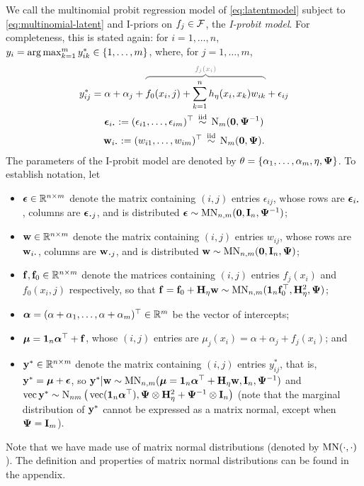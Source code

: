 We call the multinomial probit regression model of \cref{eq:latentmodel} subject to \cref{eq:multinomial-latent} and I-priors on $f_j \in {\mathcal F}$, the \emph{I-probit model}.
For completeness, this is stated again: for $i=1,\dots,n$, $y_i = \operatorname*{arg\,max}_{k=1}^m y_{ik}^* \in \{1,\dots,m\}$, where, for $j=1,\dots,m$,
\begin{align}\label{eq:iprobitmod}
  \begin{gathered}
    y_{ij}^* = \alpha + \alpha_j + 
    \greyoverbrace{f_0(x_i, j) + \sum_{k=1}^n h_\eta(x_i,x_k)w_{ik}}{f_j(x_i)}
    + \epsilon_{ij} \\
    \bepsilon_{i \bigcdot} := (\epsilon_{i1}, \dots, \epsilon_{im})^\top  \iid \N_m(\bzero, \bPsi^{-1}) \\
    \bw_{i \bigcdot} := (w_{i1},\dots,w_{im})^\top \iid \N_m(\bzero,\bPsi).
  \end{gathered}
\end{align}
The parameters of the I-probit model are denoted by $\theta = \{\alpha_1,\dots,\alpha_m,\eta,{\bm\Psi} \}$.
To establish notation, let 
\begin{itemize}
  \item ${\bm\epsilon} \in \mathbb{R}^{n \times m}$ denote the matrix containing $(i,j)$ entries $\epsilon_{ij}$, whose rows are $\bepsilon_{i \bigcdot}$, columns are $\bepsilon_{\bigcdot j}$, and is distributed ${\bm\epsilon} \sim \operatorname{MN}_{n,m}({\mathbf 0}, {\mathbf I}_n,{\bm\Psi}^{-1})$;
  \item ${\mathbf w} \in \mathbb{R}^{n \times m}$ denote the matrix containing $(i,j)$ entries $w_{ij}$, whose rows are $\bw_{i \bigcdot}$, columns are $\bw_{\bigcdot j}$, and is distributed ${\mathbf w} \sim \operatorname{MN}_{n,m}({\mathbf 0}, {\mathbf I}_n,{\bm\Psi})$;
  \item ${\mathbf f},{\mathbf f}_0 \in \mathbb{R}^{n \times m}$ denote the matrices containing $(i,j)$ entries $f_j(x_i)$ and $f_0(x_i,j)$ respectively, so that ${\mathbf f} = {\mathbf f}_0 + {\mathbf H}_\eta{\mathbf w} \sim \operatorname{MN}_{n,m}({\mathbf 1}_n{\mathbf f}_0^\top, {\mathbf H}_\eta^2, {\bm\Psi})$;
  \item ${\bm\alpha} = (\alpha + \alpha_1,\dots,\alpha + \alpha_m)^\top\in\mathbb{R}^{m}$ be the vector of intercepts;
  \item ${\bm\mu} = {\mathbf 1}_n{\bm\alpha}^\top + {\mathbf f}$, whose $(i,j)$ entries are $\mu_{j}(x_i) = \alpha + \alpha_j + f_j(x_i)$; and
  \item ${\mathbf y}^* \in \mathbb{R}^{n \times m}$ denote the matrix containing $(i,j)$ entries $y_{ij}^*$, that is, ${\mathbf y}^* = {\bm\mu} + {\bm\epsilon}$, so ${\mathbf y}^*|{\mathbf w} \sim \operatorname{MN}_{n,m}({\bm\mu} = {\mathbf 1}_n{\bm\alpha}^\top + {\mathbf H}_\eta{\mathbf w}, {\mathbf I}_n, {\bm\Psi}^{-1})$ and $\operatorname{vec} {\mathbf y}^* \sim \operatorname{N}_{nm}\big(\operatorname{vec} ({\mathbf 1}_n{\bm\alpha}^\top), {\bm\Psi} \otimes {\mathbf H}_\eta^2 + {\bm\Psi}^{-1} \otimes {\mathbf I}_n\big)$ (note that the marginal distribution of ${\mathbf y}^*$ cannot be expressed as a matrix normal, except when ${\bm\Psi}={\mathbf I}_m$). 
\end{itemize}
Note that we have made use of matrix normal distributions (denoted by $\operatorname{MN}(\cdot,\cdot)$).
The definition and properties of matrix normal distributions can be found in the appendix.

